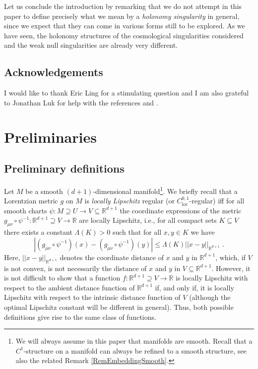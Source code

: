 \documentclass[reqno]{article}
\newcommand{\R}{\mathbb{R}}
\newcommand{\loc}{\mathrm{loc}}
\begin{document}
Let us conclude the introduction by remarking that we do not attempt in this paper to define precisely what we mean by a \emph{holonomy singularity} in general, since we expect that they can come in various forms still to be explored. As we have seen, the holonomy structures of the cosmological singularities considered and the weak null singularities are already very different. 

 


\subsection*{Acknowledgements}  I would like to thank Eric Ling for a stimulating question and I am also grateful to Jonathan Luk for help with the references \cite{LukOh19I} and \cite{LukOh19II}.


\section{Preliminaries} \label{SecPre}

\subsection{Preliminary definitions}

Let $M$ be a smooth $(d+1)$-dimensional manifold\footnote{We will always assume in this paper that manifolds are smooth. Recall that a $C^1$-structure on a manifold can always be refined to a smooth structure, see also the related Remark \ref{RemEmbeddingSmooth}.}. We briefly recall that a Lorentzian metric $g$ on $M$ is \emph{locally Lipschitz} regular (or $C^{0,1}_{\loc}$-regular)  iff for all smooth charts $\psi : M \supseteq U \to V \subseteq \R^{d+1}$ the coordinate expressions of the metric $g_{\mu \nu} \circ \psi^{-1} : \R^{d+1} \supseteq V \to \R$ are locally Lipschitz, i.e., for all compact sets $K \subseteq V$ there exists a constant $\Lambda(K) >0$ such that for all $x,y \in K$ we have
\begin{equation*}
|(g_{\mu \nu} \circ \psi^{-1}) (x) - (g_{\mu \nu} \circ \psi^{-1})(y) | \leq \Lambda(K) ||x - y||_{\R^{d+1}} \;.
\end{equation*}
Here, $||x - y||_{\R^{d+1}} $ denotes the coordinate distance of $x$ and $y$ in $\R^{d+1}$, which, if $V$ is not convex, is not necessarily the distance of $x$ and $y$ in $V \subseteq \R^{d+1}$. However, it is not difficult to show that a function $f : \R^{d+1} \supseteq V \to \R$ is locally Lipschitz with respect to the ambient distance function of $\R^{d+1}$ if, and only if, it is locally Lipschitz with respect to the intrinsic distance function of $V$ (although the optimal Lipschitz constant will be different in general). Thus, both possible definitions give rise to the same class of functions.
\end{document}
